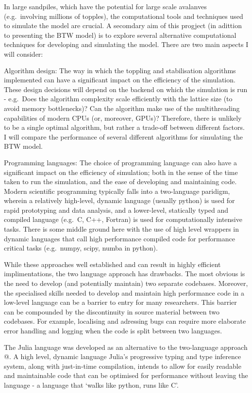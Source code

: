 \documentclass[
  letterpaper,
  DIV=11,
  numbers=noendperiod]{scrartcl}
\begin{document}
In large sandpiles, which have the potential for large scale avalanves
(e.g.~involving millions of topples), the computational tools and
techniques used to simulate the model are crucial. A secomdary aim of
this progject (in adittion to presenting the BTW model) is to explore
several alternative computational techniques for developing and
simulating the model. There are two main aspects I will consider:

Algorithm design: The way in which the toppling and stabilisation
algorithms implemented can have a significant impact on the efficiency
of the simulation. These design decisions will depend on the backend on
which the simulation is run - e.g.~Does the algorithm complexity scale
efficiently with the lattice size (to avoid memory bottlenecks)? Can the
algorithm make use of the multithreading capabilities of modern CPUs
(or, moreover, GPUs)? Therefore, there is unlikely to be a single
optimal algorithm, but rather a trade-off between different factors. I
will compare the performance of several different algorithms for
simulating the BTW model.

Programming languages: The choice of programming language can also have
a significant impact on the efficiency of simulation; both in the sense
of the time taken to run the simulation, and the ease of developing and
maintaining code. Modern scientific programming typically falls into a
two-language paridigm, wherein a relatively high-level, dynamic language
(usually python) is used for rapid prototyping and data analysis, and a
lower-level, statically typed and compiled language (e.g.~C, C++,
Fortran) is used for computationally intensive tasks. There is some
middle ground here with the use of high level wrappers in dynamic
languages that call high performance compiled code for performance
critical tasks (e.g.~numpy, scipy, numba in python).

While these approaches well established and can result in highly
efficient implimentations, the two language approach has drawbacks. The
most obvious is the need to develop (and potentially maintain) two
separate codebases. Moreover, the specialised skills needed to develop
and maintain high performance code in a low-level language can be a
barrier to entry for many researchers. This barrier can be compounded by
the discontinuity in source material between two codebases. For example,
localising and adressing bugs can require more elaborate error handling
and logging when the code is split between two languages.

The Julia language was developed as an alternative to the two-language
approach @. A high level, dynamic language Julia's progressive typing
and type inference system, along with just-in-time compilation, intends
to allow for easily readable and maintainable code that can be optimised
for performance without leaving the language - a language that `walks
like python, runs like C'.
\end{document}
